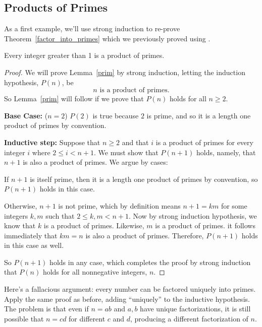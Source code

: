 \subsection{Products of Primes}

As a first example, we'll use strong induction to re-prove
Theorem~\ref{factor_into_primes} which we previously proved using .

\begin{lemma}\label{prim}
Every integer greater than 1 is a product of primes.
\end{lemma}

\begin{proof}

We will prove Lemma~\ref{prim} by strong induction, letting the induction
hypothesis, $P(n)$, be
\[
n \text{ is a product of primes}.
\]
So Lemma~\ref{prim} will follow if we prove that $P(n)$ holds for all $n
\geq 2$.

\textbf{Base Case:} ($n=2$) $P(2)$ is true because $2$ is prime, and so it is
a length one product of primes by convention.

\textbf{Inductive step:} Suppose that $n \geq 2$ and that $i$ is a product
of primes for every integer $i$ where $2 \leq i < n+1$.  We must show that
$P(n+1)$ holds, namely, that $n+1$ is also a product of primes.  We argue
by cases:

If $n+1$ is itself prime, then it is a length one product of primes by
convention, so $P(n+1)$ holds in this case.

Otherwise, $n + 1$ is not prime, which by definition means $n+1 = km$ for
some integers $k,m$ such that $2 \leq k,m < n+1$.  Now by strong induction
hypothesis, we know that $k$ is a product of primes.  Likewise,
$m$ is a product of primes.  it follows immediately that $km = n$ is
also a product of primes.  Therefore, $P(n+1)$ holds in this case as well.

So $P(n+1)$ holds in any case, which completes the proof by strong
induction that $P(n)$ holds for all nonnegative integers, $n$.

\end{proof}

\iffalse

Here's a fallacious argument: every number can be factored uniquely
into primes.  Apply the same proof as before, adding ``uniquely'' to
the inductive hypothesis.  The problem is that even if $n=ab$ and
$a,b$ have unique factorizations, it is still possible that $n=cd$ for
different $c$ and $d$, producing a different factorization of $n$.


